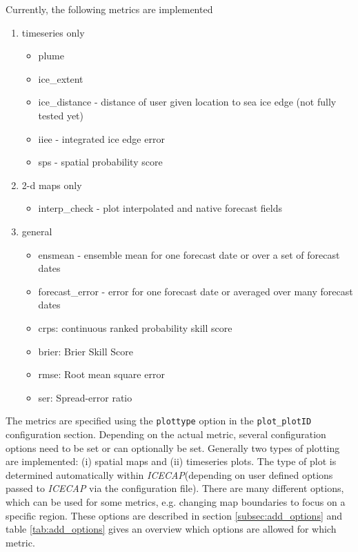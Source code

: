 \documentclass[DIV=10, parskip=full]{scrreprt}
\newcommand{\ice}{\textit{ICECAP}\xspace}
\newcommand{\notimplement}[1]{#1}
\begin{document}
Currently, the following metrics are \notimplement{implemented}
\begin{enumerate}
	\item timeseries only
	\begin{itemize}
		\item plume
		\item ice\_extent
		\item ice\_distance - distance of user given location to sea ice edge (not fully tested yet)
		\item iiee - integrated ice edge error
		\item sps - spatial probability score
	\end{itemize}
	\item 2-d maps only
	\begin{itemize}
		\item interp\_check - plot interpolated and native forecast fields
	\end{itemize}
	\item general
		\begin{itemize}
		\item ensmean - ensemble mean for one forecast date or over a set of forecast dates 
		\item forecast\_error - error for one forecast date or averaged over many forecast dates
		\item crps: continuous ranked probability skill score
		\item brier: Brier Skill Score
		\item rmse: Root mean square error
		\item ser: Spread-error ratio
	\end{itemize}
\end{enumerate}

The metrics are specified using the \texttt{plottype} option in the \texttt{plot\_plotID} configuration section. Depending on the actual metric, several configuration options need to be set or can optionally be set. Generally two types of plotting are implemented: (i) spatial maps and (ii) timeseries plots. The type of plot is determined automatically within \ice (depending on user defined options passed to \ice via the configuration file). There are many different options, which can be used for some metrics, e.g. changing map boundaries to focus on a specific region. These options are described in section \ref{subsec:add_options} and table \ref{tab:add_options} gives an overview which options are allowed for which metric.
\end{document}
